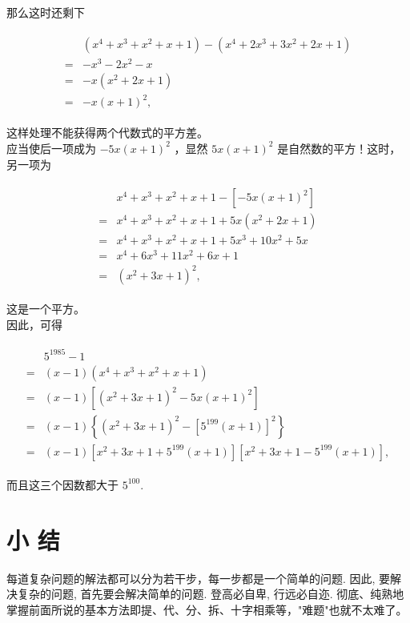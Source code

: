 \documentclass[10pt]{article}
\begin{document}
那么这时还剩下

\begin{align*}
\begin{aligned}
& \left(x^{4}+x^{3}+x^{2}+x+1\right)-\left(x^{4}+2 x^{3}+3 x^{2}+2 x+1\right) \\
= & -x^{3}-2 x^{2}-x \\
= & -x\left(x^{2}+2 x+1\right) \\
= & -x(x+1)^{2},
\end{aligned}
\end{align*}

这样处理不能获得两个代数式的平方差。\\
应当使后一项成为 $-5 x(x+1)^{2}$ ，显然 $5 x(x+1)^{2}$ 是自然数的平方！这时，另一项为

\begin{align*}
\begin{aligned}
& x^{4}+x^{3}+x^{2}+x+1-\left[-5 x(x+1)^{2}\right] \\
= & x^{4}+x^{3}+x^{2}+x+1+5 x\left(x^{2}+2 x+1\right) \\
= & x^{4}+x^{3}+x^{2}+x+1+5 x^{3}+10 x^{2}+5 x \\
= & x^{4}+6 x^{3}+11 x^{2}+6 x+1 \\
= & \left(x^{2}+3 x+1\right)^{2},
\end{aligned}
\end{align*}

这是一个平方。\\
因此，可得

\begin{align*}
\begin{aligned}
& 5^{1985}-1 \\
= & (x-1)\left(x^{4}+x^{3}+x^{2}+x+1\right) \\
= & (x-1)\left[\left(x^{2}+3 x+1\right)^{2}-5 x(x+1)^{2}\right] \\
= & (x-1)\left\{\left(x^{2}+3 x+1\right)^{2}-\left[5^{199}(x+1)\right]^{2}\right\} \\
= & (x-1)\left[x^{2}+3 x+1+5^{199}(x+1)\right]\left[x^{2}+3 x+1-5^{199}(x+1)\right],
\end{aligned}
\end{align*}

而且这三个因数都大于 $5^{100}$.

\section*{小 结}
每道复杂问题的解法都可以分为若干步，每一步都是一个简单的问题. 因此, 要解决复杂的问题, 首先要会解决简单的问题. 登高必自卑, 行远必自迩. 彻底、纯熟地掌握前面所说的基本方法即提、代、分、拆、十字相乘等，"难题"也就不太难了。
\end{document}
